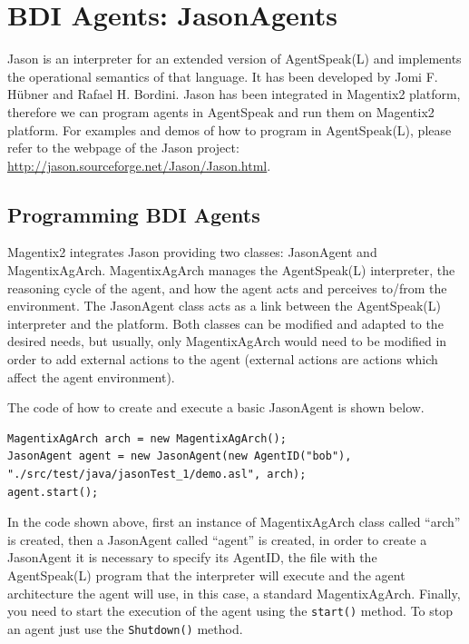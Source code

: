 \chapter{BDI Agents: JasonAgents}
Jason\cite{bordini05} is an interpreter for an extended version of AgentSpeak(L)\cite{Rao96} and implements the operational semantics of that language. It has been developed by Jomi F. H\"ubner and Rafael H. Bordini. Jason has been integrated in Magentix2 platform, therefore we can program agents in AgentSpeak and run them on Magentix2 platform. For examples and demos of how to program in AgentSpeak(L), please refer to the webpage of the Jason project: \url{http://jason.sourceforge.net/Jason/Jason.html}.


\section{Programming BDI Agents} %

Magentix2 integrates Jason providing two classes: JasonAgent and MagentixAgArch. MagentixAgArch manages the AgentSpeak(L) interpreter, the reasoning cycle of the agent, and how the agent acts and perceives to/from the environment. The JasonAgent class acts as a link between the AgentSpeak(L) interpreter and the platform. Both classes can be modified and adapted to the desired needs, but usually, only MagentixAgArch would need to be modified in order to add external actions to the agent (external actions are actions which affect the agent environment).

The code of how to create and execute a basic JasonAgent is shown below.
\begin{lstlisting}[style=Java]
MagentixAgArch arch = new MagentixAgArch();
JasonAgent agent = new JasonAgent(new AgentID("bob"), "./src/test/java/jasonTest_1/demo.asl", arch);
agent.start();
\end{lstlisting}
In the code shown above, first an instance of MagentixAgArch class called ``arch'' is created, then a JasonAgent called ``agent'' is created, in order to create a JasonAgent it is necessary to specify its AgentID, the file with the AgentSpeak(L) program that the interpreter will execute and the agent architecture the agent will use, in this case, a standard MagentixAgArch. Finally, you need to start the execution of the agent using the \texttt{start()} method. To stop an agent just use the \texttt{Shutdown()} method.

